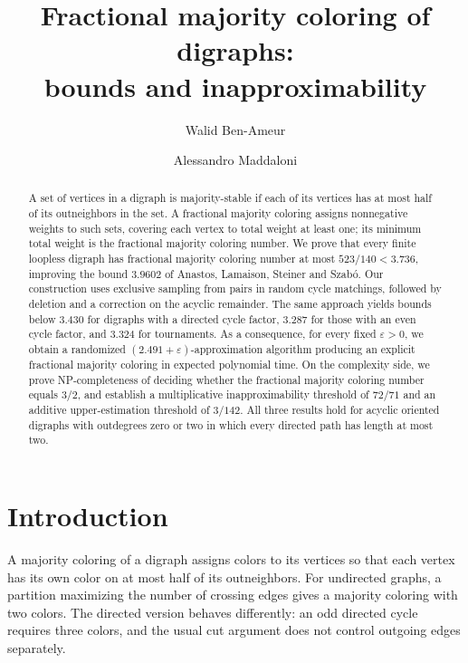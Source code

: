 \documentclass[12pt]{article}
\title{Fractional majority coloring of digraphs:\\bounds and inapproximability}
\author{Walid Ben-Ameur\and Alessandro Maddaloni}
\date{}
\begin{document}
\maketitle

\begin{abstract}
A set of vertices in a digraph is majority-stable if each of its vertices has at most half of its outneighbors in the set. A fractional majority coloring assigns nonnegative weights to such sets, covering each vertex to total weight at least one; its minimum total weight is the fractional majority coloring number. We prove that every finite loopless digraph has fractional majority coloring number at most \(523/140<3.736\), improving the bound \(3.9602\) of Anastos, Lamaison, Steiner and Szab\'o. Our construction uses exclusive sampling from pairs in random cycle matchings, followed by deletion and a correction on the acyclic remainder. The same approach yields bounds below \(3.430\) for digraphs with a directed cycle factor, \(3.287\) for those with an even cycle factor, and \(3.324\) for tournaments. As a consequence, for every fixed \(\varepsilon>0\), we obtain a randomized \((2.491+\varepsilon)\)-approximation algorithm producing an explicit fractional majority coloring in expected polynomial time. On the complexity side, we prove NP-completeness of deciding whether the fractional majority coloring number equals $3/2$, and establish a multiplicative inapproximability threshold of $72/71$ and an additive upper-estimation threshold of $3/142$. All three results hold for acyclic oriented digraphs with outdegrees zero or two in which every directed path has length at most two.

\end{abstract}

\section{Introduction}
A majority coloring of a digraph assigns colors to its vertices so that each vertex has its own color on at most half of its outneighbors. For undirected graphs, a partition maximizing the number of crossing edges gives a majority coloring with two colors. The directed version behaves differently: an odd directed cycle requires three colors, and the usual cut argument does not control outgoing edges separately.
\end{document}
